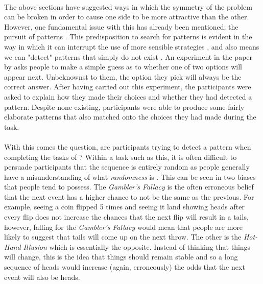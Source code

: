 \documentclass[12pt]{article}
\begin{document}
\paragraph{} The above sections have suggested ways in which the symmetry of the problem can be broken in order to cause one side to be more attractive than the other. However, one fundamental issue with this has already been mentioned; the pursuit of patterns \citep{wolford2004searching}. This predisposition to search for patterns is evident in the way in which it can interrupt the use of more sensible strategies \citep{wolford2004searching}, and also means we can "detect" patterns that simply do not exist \cite{yellott1969probability}. An experiment in the paper by \cite{yellott1969probability} asks people to make a simple guess as to whether one of two options will appear next. Unbeknownst to them, the option they pick will always be the correct answer. After having carried out this experiment, the participants were asked to explain how they made their choices and whether they had detected a pattern. Despite none existing, participants were able to produce some fairly elaborate patterns that also matched onto the choices they had made during the task. 

\paragraph{} With this comes the question, are participants trying to detect a pattern when completing the tasks of \cite{clarke2015failure}? Within a task such as this, it is often difficult to persuade participants that the sequence is entirely random as people generally have a misunderstanding of what \textit{randomness} is \citep{Ayton2004}. This can be seen in two biases that people tend to possess. The \textit{Gambler's Fallacy} is the often erroneous belief that the next event has a higher chance to not be the same as the previous. For example, seeing a coin flipped 5 times and seeing it land showing heads after every flip does not increase the chances that the next flip will result in a tails, however, falling for the \textit{Gambler's Fallacy} would mean that people are more likely to suggest that tails will come up on the next throw. The other is the \textit{Hot-Hand Illusion} which is essentially the opposite. Instead of thinking that things will change, this is the idea that things should remain stable and so a long sequence of heads would increase (again, erroneously) the odds that the next event will also be heads.  
\end{document}
